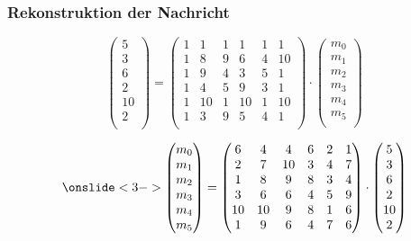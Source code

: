 \documentclass[11pt,aspectratio=169]{beamer}
\begin{document}
	\begin{frame}
		\frametitle{Rekonstruktion der Nachricht}
		
		\[
		\begin{pmatrix}
			5 \\ 3 \\ 6 \\ 2 \\ 10 \\ 2 \\
		\end{pmatrix}
		=
		\begin{pmatrix}
			1&  1& 1&  1& 1&  1\\
			1&  8& 9&  6& 4& 10\\
			1&  9& 4&  3& 5&  1\\
			1&  4& 5&  9& 3&  1\\
			1& 10& 1& 10& 1& 10\\
			1&  3& 9&  5& 4&  1\\
		\end{pmatrix}
		\cdot
		\begin{pmatrix}
			m_0 \\ m_1 \\ m_2 \\ m_3 \\ m_4 \\ m_5 \\
		\end{pmatrix}
		\]
		
		\begin{center}
		\end{center}
		\[
		\onslide<3->{
		\begin{pmatrix}
			m_0 \\ m_1 \\ m_2 \\ m_3 \\ m_4 \\ m_5 \\
		\end{pmatrix}
		=
		\begin{pmatrix}
			 6&  4&  4&  6& 2&  1\\
			 2&  7& 10&  3& 4&  7\\
			 1&  8&  9&  8& 3&  4\\
			 3&  6&  6&  4& 5&  9\\
			10& 10&  9&  8& 1&  6\\
			 1&  9&  6&  4& 7&  6\\
		\end{pmatrix}
		\cdot
		\begin{pmatrix}
			5 \\ 3 \\ 6 \\ 2 \\ 10 \\ 2 \\
		\end{pmatrix}
		}
		\]
		
	\end{frame}
\end{document}
